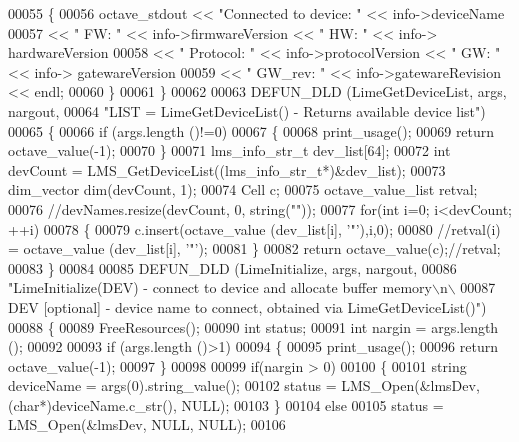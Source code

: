 \begin{DoxyCode}
00055     \{
00056         octave\_stdout << \textcolor{stringliteral}{"Connected to device: "} << info->deviceName
00057                       << \textcolor{stringliteral}{" FW: "} << info->firmwareVersion << \textcolor{stringliteral}{" HW: "} << info->
      hardwareVersion
00058                       << \textcolor{stringliteral}{" Protocol: "} << info->protocolVersion << \textcolor{stringliteral}{" GW: "} << info->
      gatewareVersion
00059                       << \textcolor{stringliteral}{" GW\_rev: "} << info->gatewareRevision << endl;
00060     \}
00061 \}
00062 
00063 DEFUN_DLD (LimeGetDeviceList, args, nargout,
00064 \textcolor{stringliteral}{"LIST = LimeGetDeviceList() - Returns available device list"})
00065 \{
00066     \textcolor{keywordflow}{if} (args.length ()!=0)
00067     \{
00068         print\_usage();
00069         \textcolor{keywordflow}{return} octave\_value(-1);
00070     \}
00071     lms_info_str_t dev\_list[64];
00072     \textcolor{keywordtype}{int} devCount = LMS_GetDeviceList((lms_info_str_t*)&dev\_list);
00073     dim\_vector dim(devCount, 1);
00074     Cell c;
00075     octave\_value\_list retval;
00076     \textcolor{comment}{//devNames.resize(devCount, 0, string(""));}
00077     \textcolor{keywordflow}{for}(\textcolor{keywordtype}{int} i=0; i<devCount; ++i)
00078     \{
00079         c.insert(octave\_value (dev\_list[i], \textcolor{charliteral}{'"'}),i,0);
00080         \textcolor{comment}{//retval(i) =  octave\_value (dev\_list[i], '"');}
00081     \}
00082     \textcolor{keywordflow}{return} octave\_value(c);\textcolor{comment}{//retval;}
00083 \}
00084 
00085 DEFUN_DLD (LimeInitialize, args, nargout,
00086 \textcolor{stringliteral}{"LimeInitialize(DEV) - connect to device and allocate buffer memory\(\backslash\)n\(\backslash\)}
00087 \textcolor{stringliteral}{DEV [optional] - device name to connect, obtained via LimeGetDeviceList()"})
00088 \{
00089     FreeResources();
00090     \textcolor{keywordtype}{int} status;
00091     \textcolor{keywordtype}{int} nargin = args.length ();
00092 
00093     \textcolor{keywordflow}{if} (args.length ()>1)
00094     \{
00095         print\_usage();
00096         \textcolor{keywordflow}{return} octave\_value(-1);
00097     \}
00098 
00099     \textcolor{keywordflow}{if}(nargin > 0)
00100     \{
00101         \textcolor{keywordtype}{string} deviceName = args(0).string\_value();
00102         status = LMS_Open(&lmsDev, (\textcolor{keywordtype}{char}*)deviceName.c\_str(), NULL);
00103     \}
00104     \textcolor{keywordflow}{else}
00105         status = LMS_Open(&lmsDev, NULL, NULL);
00106 

\end{DoxyCode}
